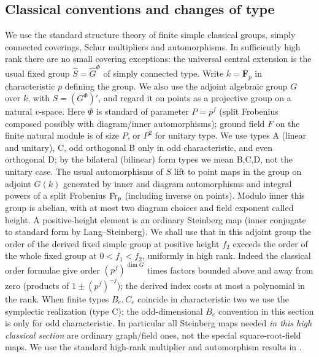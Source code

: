 \subsection{Classical conventions and changes of type}

\begin{convention}\label{w:classical-conventions}
We use the standard structure theory of finite simple classical groups, simply connected coverings, Schur multipliers and automorphisms. In sufficiently high rank there are no small covering exceptions: the universal central extension is the usual fixed group \(\widehat S=\widehat G^\Phi\) of simply connected type. Write \(k=\overline{\mathbf F}_p\) in characteristic \(p\) defining the group. We also use the adjoint algebraic group \(G\) over \(k\), with \(S=(G^\Phi)'\), and regard it on points as a projective group on a natural \(v\)-space. Here \(\Phi\) is standard of parameter \(P=p^f\) (split Frobenius composed possibly with diagram/inner automorphisms); ground field \(F\) on the finite natural module is of size \(P\), or \(P^2\) for unitary type. We use types A (linear and unitary), C, odd orthogonal B only in odd characteristic, and even orthogonal D; by the bilateral (bilinear) form types we mean B,C,D, not the unitary case. The usual automorphisms of \(S\) lift to point maps in the group on adjoint \(G(k)\) generated by inner and diagram automorphisms and integral powers of a split Frobenius \({\rm Fr}_p\) (including inverse on points). Modulo inner this group is abelian, with at most two diagram choices and field exponent called height. A positive-height element is an ordinary Steinberg map (inner conjugate to standard form by Lang--Steinberg). We shall use that in this adjoint group the order of the derived fixed simple group at positive height \(f_2\) exceeds the order of the whole fixed group at \(0<f_1<f_2\), uniformly in high rank. Indeed the classical order formulae give order \((p^f)^{\dim G}\) times factors bounded above and away from zero (products of \(1\pm(p^f)^{-j}\)); the derived index costs at most a polynomial in the rank. When finite types \(B_e,C_e\) coincide in characteristic two we use the symplectic realization (type C); the odd-dimensional \(B_e\) convention in this section is only for odd characteristic. In particular all Steinberg maps needed \emph{in this high classical section} are ordinary graph/field ones, not the special square-root-field maps. We use the standard high-rank multiplier and automorphism results in \citet{GLS1994,KleidmanLiebeck1990}.
\end{convention}

